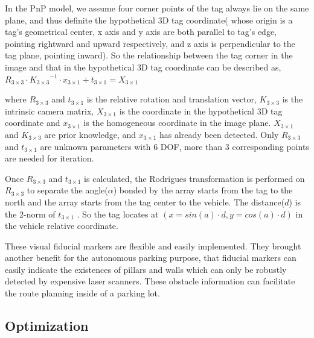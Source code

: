 \documentclass[journal]{IEEEtran}
\begin{document}
In the PnP model, we assume four corner points of the tag always lie on the same plane, and thus definite the hypothetical 3D tag coordinate( whose origin is a tag’s geometrical center, x axis and y axis are both parallel to tag’s edge, pointing rightward and upward respectively, and z axis is perpendicular to the tag plane, pointing inward). 
So the relationship between the tag corner in the image and that in the hypothetical 3D tag coordinate can be described as,
${R}_{3 \times 3} \cdot {{K}_{3 \times 3}}^{-1} \cdot {x}_{3 \times 1}+{t}_{3 \times 1}={X}_{3 \times 1}$

where ${R}_{3 \times 3}$ and ${t}_{3 \times 1}$ is the relative rotation and translation vector, 
${K}_{3 \times 3}$ is the intrinsic camera matrix, 
${X}_{3 \times 1}$ is the coordinate in the hypothetical 3D tag coordinate and ${x}_{3 \times 1}$ is the homogeneous coordinate in the image plane. 
${X}_{3 \times 1}$ and ${K}_{3 \times 3}$ are prior knowledge, 
and ${x}_{3 \times 1}$ has already been detected. 
Only ${R}_{3 \times 3}$ and ${t}_{3 \times 1}$ are unknown parameters with 6 DOF, more than 3 corresponding points are needed for iteration. 

Once ${R}_{3 \times 3}$ and ${t}_{3 \times 1}$ is calculated, the Rodrigues transformation is performed on ${R}_{3 \times 3}$ to separate the angle($\alpha$) bonded by the array starts from the tag to the north and the array starts from the tag center to the vehicle. 
The distance($d$) is the 2-norm of ${t}_{3 \times 1}$ . 
So the tag locates at $( x=sin(a) \cdot d, y=cos(a) \cdot d)$ in the vehicle relative coordinate.

%

These visual fiducial markers are flexible and easily implemented.
They brought another benefit for the autonomous parking purpose, that fiducial markers can easily indicate the existences of pillars and walls which can only be robustly detected by expensive laser scanners.
These obstacle information can facilitate the route planning inside of a parking lot. 

\subsection{Optimization}
\end{document}
